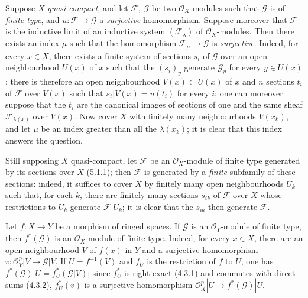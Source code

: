 \begin{env}[5.2.3]
\label{0.5.2.3}
Suppose $X$ \emph{quasi-compact}, and let $\mathcal{F}$, $\mathcal{G}$ be two
$\mathcal{O}_X$-modules such that $\mathcal{G}$ is of \emph{finite type},
and $u:\mathcal{F}\to\mathcal{G}$ a \emph{surjective} homomorphism. Suppose
moreover that $\mathcal{F}$ is the inductive limit of an inductive system
$(\mathcal{F}_\lambda)$ of $\mathcal{O}_X$-modules. Then there exists an index
$\mu$ such that the homomorphism $\mathcal{F}_\mu\to\mathcal{G}$ is
\emph{surjective}. Indeed, for every $x\in X$, there exists a finite system of
sections $s_i$ of $\mathcal{G}$ over an open neighbourhood $U(x)$ of $x$
such that the $(s_i)_y$ generate $\mathcal{G}_y$ for every $y\in U(x)$; there is
therefore an open neighbourhood $V(x)\subset U(x)$ of $x$ and $n$ sections $t_i$ of
$\mathcal{F}$ over $V(x)$ such that
$s_i|V(x)=u(t_i)$ for every $i$; one can moreover suppose that the $t_i$ are
the canonical images of sections of one and the same sheaf
$\mathcal{F}_{\lambda(x)}$ over $V(x)$. Now cover $X$ with
finitely many neighbourhoods $V(x_k)$, and let $\mu$ be an index greater than all
the $\lambda(x_k)$; it is clear that this index answers the question.

Still supposing $X$ quasi-compact, let $\mathcal{F}$ be an
$\mathcal{O}_X$-module of finite type generated by its sections over $X$
(5.1.1); then $\mathcal{F}$ is generated by a \emph{finite} subfamily
of these sections: indeed, it suffices to cover $X$ by finitely many
open neighbourhoods $U_k$ such that, for each $k$, there are finitely many
sections $s_{ik}$ of $\mathcal{F}$ over $X$ whose restrictions to
$U_k$ generate $\mathcal{F}|U_k$; it is clear that the $s_{ik}$ then generate
$\mathcal{F}$.
\end{env}

\begin{env}[5.2.4]
\label{0.5.2.4}
Let $f:X\to Y$ be a morphism of ringed spaces. If $\mathcal{G}$ is an
$\mathcal{O}_Y$-module of finite type, then $f^*(\mathcal{G})$ is an
$\mathcal{O}_X$-module of finite type. Indeed, for every $x\in X$, there are an
open neighbourhood $V$ of $f(x)$ in $Y$ and a surjective homomorphism
$v:\mathcal{O}_Y^p|V\to\mathcal{G}|V$. If $U=f^{-1}(V)$ and $f_U$ is the
restriction of $f$ to $U$, one has
$f^*(\mathcal{G})|U=f_U^*(\mathcal{G}|V)$; since $f_U^*$ is right exact
(4.3.1) and commutes with direct sums (4.3.2), $f_U^*(v)$ is a
surjective homomorphism
$\mathcal{O}_X^p|U\to f^*(\mathcal{G})|U$.
\end{env}

